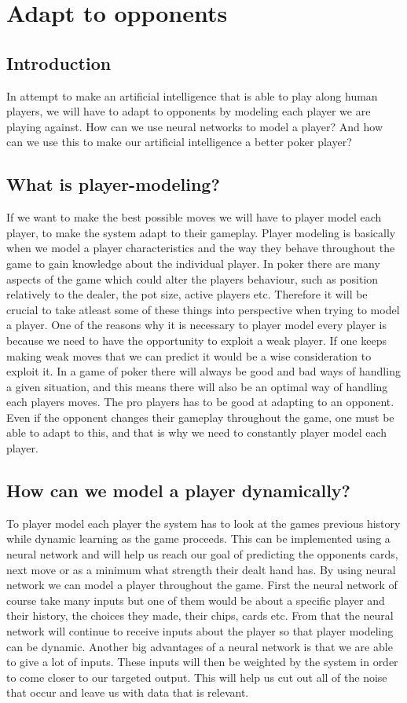 \section{Adapt to opponents}

\subsection{Introduction}
In attempt to make an artificial intelligence that is able to play along human players, we will have to adapt to opponents by modeling each player we are playing against. How can we use neural networks to model a player? And how can we use this to make our artificial intelligence a better poker player?

\subsection{What is player-modeling?}
If we want to make the best possible moves we will have to player model each player, to make the system adapt to their gameplay.
Player modeling is basically when we model a player characteristics and the way they behave throughout the game to gain knowledge about the individual player. 
In poker there are many aspects of the game which could alter the players behaviour, such as position relatively to the dealer, the pot size, active players etc. Therefore it will be crucial to take atleast some of these things into perspective when trying to model a player. One of the reasons why it is necessary to player model every player is because we need to have the opportunity to exploit a weak player. If one keeps making weak moves that we can predict it would be a wise consideration to exploit it.
In a game of poker there will always be good and bad ways of handling a given situation, and this means there will also be an optimal way of handling each players moves. 
The pro players has to be good at adapting to an opponent. Even if the opponent changes their gameplay throughout the game, one must be able to adapt to this, and that is why we need to constantly player model each player.

\subsection{How can we model a player dynamically?}
To player model each player the system has to look at the games previous history while dynamic learning as the game proceeds.
This can be implemented using a neural network and will help us reach our goal of predicting the opponents cards, next move or as a minimum what strength their dealt hand has. By using neural network we can model a player throughout the game. First the neural network of course take many inputs but one of them would be about a specific player and their history, the choices they made, their chips, cards etc. From that the neural network will continue to receive inputs about the player so that player modeling can be dynamic.
Another big advantages of a neural network is that we are able to give a lot of inputs. These inputs will then be weighted by the system in order to come closer to our targeted output.
This will help us cut out all of the noise that occur and leave us with data that is relevant.


